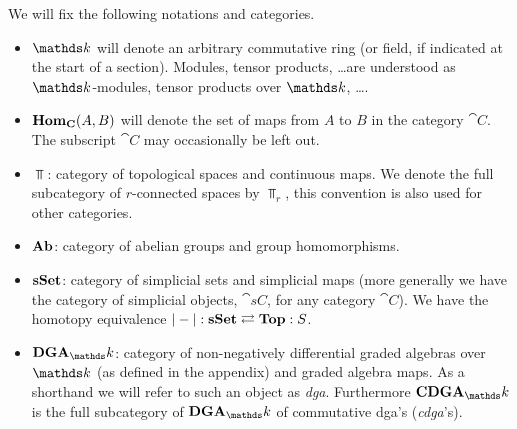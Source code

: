We will fix the following notations and categories.
\begin{itemize}
	\item $\k$ will denote an arbitrary commutative ring (or field, if indicated at the start of a section). Modules, tensor products, \dots are understood as $\k$-modules, tensor products over $\k$, \dots.
	\item $\mathbf{Hom}_{\mathbf{C}}(A, B)$ will denote the set of maps from $A$ to $B$ in the category $\cat{C}$. The subscript $\cat{C}$ may occasionally be left out.
	\item $\Top$: category of topological spaces and continuous maps. We denote the full subcategory of $r$-connected spaces by $\Top_r$, this convention is also used for other categories.
	\item $\mathbf{Ab}$: category of abelian groups and group homomorphisms.
	\item $\mathbf{s{\mathbf{Set}}}$: category of simplicial sets and simplicial maps (more generally we have the category of simplicial objects, $\cat{sC}$, for any category $\cat{C}$). We have the homotopy equivalence $|-| : \mathbf{s{\mathbf{Set}}} \rightleftarrows \mathbf{Top} : S$.
	\item $\DGA_\k$: category of non-negatively differential graded algebras over $\k$ (as defined in the appendix) and graded algebra  maps. As a shorthand we will refer to such an object as \emph{dga}. Furthermore $\CDGA_\k$ is the full subcategory of $\DGA_\k$ of commutative dga's (\emph{cdga}'s).
\end{itemize}

\tableofcontents
{}
